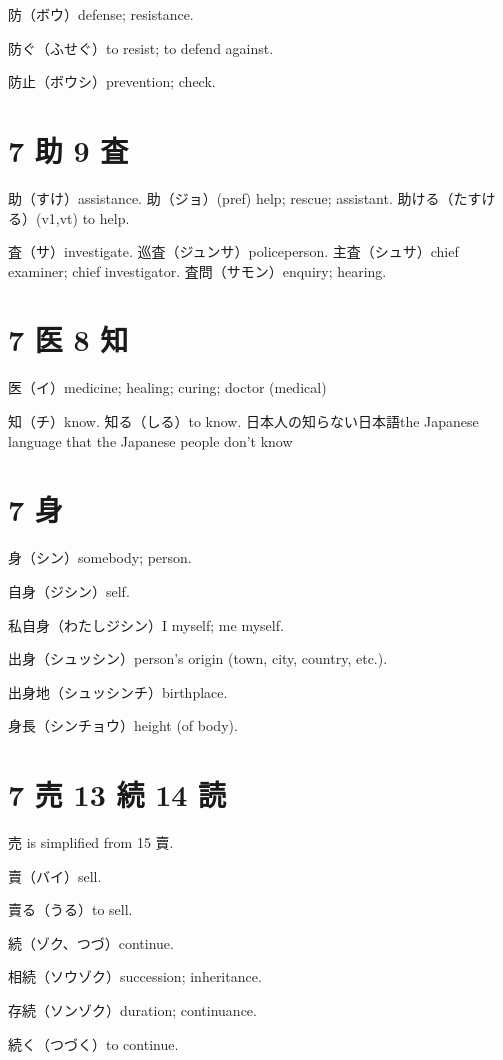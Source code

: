 防（ボウ）defense; resistance.

防ぐ（ふせぐ）to resist; to defend against.

防止（ボウシ）prevention; check.

\section{7 助 9 査}

助（すけ）assistance.
助（ジョ）(pref) help; rescue; assistant.
助ける（たすける）(v1,vt) to help.

査（サ）investigate.
巡査（ジュンサ）policeperson.
主査（シュサ）chief examiner; chief investigator.
査問（サモン）enquiry; hearing.

\section{7 医 8 知}

医（イ）medicine; healing; curing; doctor (medical)

知（チ）know.
知る（しる）to know.
日本人の知らない日本語the Japanese language that the Japanese people don't know

\section{7 身}

身（シン）somebody; person.

自身（ジシン）self.

私自身（わたしジシン）I myself; me myself.

出身（シュッシン）person's origin (town, city, country, etc.).

出身地（シュッシンチ）birthplace.

身長（シンチョウ）height (of body).

\section{7 売 13 続 14 読}

売 is simplified from 15 賣.

賣（バイ）sell.

賣る（うる）to sell.

続（ゾク、つづ）continue.

相続（ソウゾク）succession; inheritance.

存続（ソンゾク）duration; continuance.

続く（つづく）to continue.

